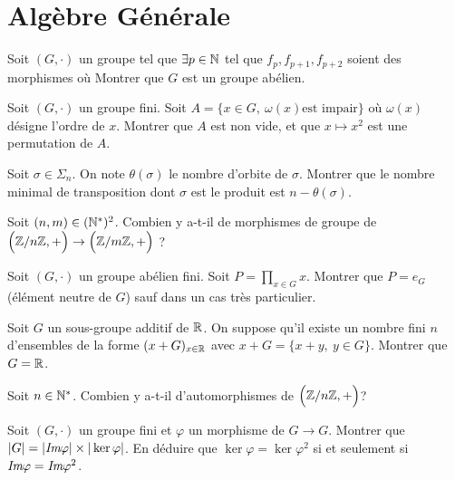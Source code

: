 \section{Algèbre Générale}

\begin{exercise}
	Soit $(G,\cdot)$ un groupe tel que $\exists p\in\mathbb{N}$ tel que
	$f_p,f_{p+1},f_{p+2}$ soient des morphismes où
	Montrer que $G$ est un groupe abélien.
\end{exercise}

\begin{exercise}
	Soit $(G,\cdot)$ un groupe fini. Soit $A=\{x\in G,~\omega(x)\text{est
	impair}\}$ où $\omega(x)$ désigne l'ordre de $x$. Montrer que $A$ est non
	vide, et que $x\mapsto x^2$ est une permutation de $A$.
\end{exercise}

\begin{exercise}
	Soit $\sigma\in\Sigma_n$. On note $\theta(\sigma)$ le nombre d'orbite de
	$\sigma$. Montrer que le nombre minimal de transposition dont $\sigma$ est le
	produit est $n-\theta(\sigma)$.
\end{exercise}

\begin{exercise}
	Soit $(n,m)\in(\mathbb{N}^*)^2$. Combien y a-t-il de morphismes de groupe de
	$\Bigl(\mathbb{Z}/n\mathbb{Z}, +\Bigr)\to\Bigl(\mathbb{Z}/m\mathbb{Z}, +\Bigr)$ ?
\end{exercise}

\begin{exercise}
	Soit $(G,\cdot)$ un groupe abélien fini. Soit $P=\prod_{x\in G}x$. Montrer que
	$P=e_{G}$ (élément neutre de $G$) sauf dans un cas très particulier.
\end{exercise}

\begin{exercise}
	Soit $G$ un sous-groupe additif de $\mathbb{R}$. On suppose qu'il existe un nombre
	fini $n$ d'ensembles de la forme $(x+G)_{x\in\mathbb{R}}$ avec $x+G=\{x+y,~y\in G\}$.
	Montrer que $G=\mathbb{R}$.
\end{exercise}

\begin{exercise}
	Soit $n\in\mathbb{N}^*$. Combien y a-t-il d'automorphismes de $\Bigl(\mathbb{Z}/n\mathbb{Z}, +\Bigr)$?
\end{exercise}

\begin{exercise}
	Soit $(G,\cdot)$ un groupe fini et $\varphi$ un morphisme de $G\to G$. Montrer
	que $\vert G\vert=\vert\emph{Im}\varphi\vert\times\vert\ker\varphi\vert$. En déduire
	que $\ker\varphi=\ker\varphi^2$ si et seulement si $\emph{Im}\varphi=\emph{Im}\varphi^2$.
	
\end{exercise}

